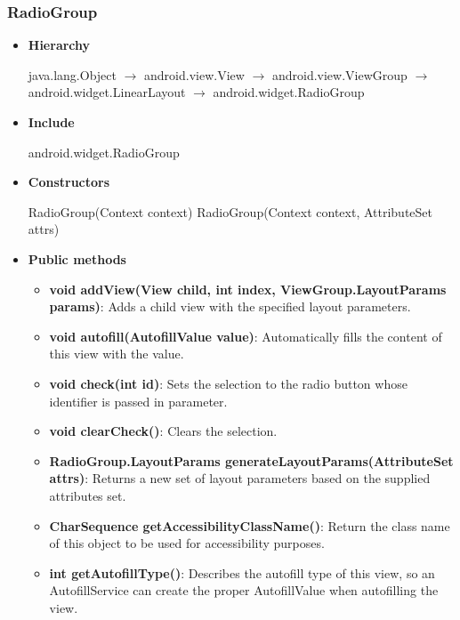 \documentclass{report}
\begin{document}
    \subsubsection{RadioGroup}
    \begin{itemize}
         \item \textbf{Hierarchy} 
            \begin{center}
                java.lang.Object $\to$	android.view.View $\to$	android.view.ViewGroup $\to$	android.widget.LinearLayout $\to$	android.widget.RadioGroup
            \end{center}
        \item \textbf{Include}
            \bigbreak \noindent 
            \begin{javacode}
                android.widget.RadioGroup
            \end{javacode}
        \item \textbf{Constructors}
            \bigbreak \noindent 
            \begin{javacode}
                RadioGroup(Context context)
                RadioGroup(Context context, AttributeSet attrs)
            \end{javacode}
        \item \textbf{Public methods}
            \begin{itemize}
                \item \textbf{void	addView(View child, int index, ViewGroup.LayoutParams params)}: Adds a child view with the specified layout parameters.
                \item \textbf{void	autofill(AutofillValue value)}: Automatically fills the content of this view with the value.
                \item \textbf{void	check(int id)}: Sets the selection to the radio button whose identifier is passed in parameter.
                \item \textbf{void	clearCheck()}: Clears the selection.
                \item \textbf{RadioGroup.LayoutParams	generateLayoutParams(AttributeSet attrs)}: Returns a new set of layout parameters based on the supplied attributes set.
                \item \textbf{CharSequence	getAccessibilityClassName()}: Return the class name of this object to be used for accessibility purposes.
                \item \textbf{int	getAutofillType()}: Describes the autofill type of this view, so an AutofillService can create the proper AutofillValue when autofilling the view.

\end{itemize}
\end{itemize}
\end{document}
